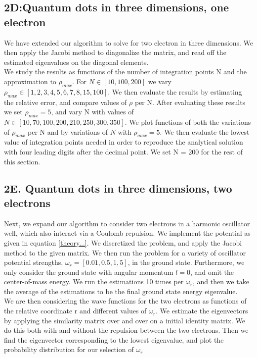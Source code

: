\documentclass[%
reprint,
amsmath,amssymb,
aps,
]{revtex4-1}
\begin{document}
\subsection{2D:Quantum dots in three dimensions, one electron} \noindent 
We have extended our algorithm to solve for two electron in three dimensions. We then apply the Jacobi method to diagonalize the matrix, and read off the estimated eigenvalues on the diagonal elements. \\ \indent We study the results as functions of the number of integration points N and the approximation to $\rho_{max}$. For $N\in[10,100,200]$ we vary $\rho_{max} \in [1, 2, 3, 4, 5, 6, 7, 8, 15, 100]$. We then evaluate the results by estimating the relative error, and compare values of $\rho$ per N. After evaluating these results we set $\rho_{max} = 5$, and vary N with values of $N\in[10, 70, 100, 200, 210, 250, 300, 350]$. We plot functions of both the variations of $\rho_{max}$ per N and by variations of $N$ with $\rho_{max} = 5$. We then evaluate the lowest value of integration points needed in order to reproduce the analytical solution with four leading digits after the decimal point. We set N = 200 for the rest of this section. 

\subsection{2E. Quantum dots in three dimensions, two electrons}
Next, we expand our algorithm to consider two electrons in a harmonic oscillator well, which also interact via a Coulomb repulsion. We implement the potential as given in equation \ref{theory...}. We discretized the problem, and apply the Jacobi method to the given matrix. We then run the problem for a variety of oscillator potential strengths, $\omega_r = [0.01,0.5,1,5]$, in the ground state. Furthermore, we only consider the ground state with angular momentum $l = 0$, and omit the center-of-mass energy. We run the estimations 10 times per $\omega_r$, and then we take the average of the estimations to be the final ground state energy eigenvalue.\\ \indent 
We are then considering the wave functions for the two electrons as functions of the relative coordinate r and different values of $\omega_r$. We estimate the eigenvectors by applying the similarity matrix over and over on a initial identity matrix. We do this both with and without the repulsion between the two electrons. Then we find the eigenvector corresponding to the lowest eigenvalue, and plot the probability distribution for our selection of $\omega_r$ 
\end{document}
